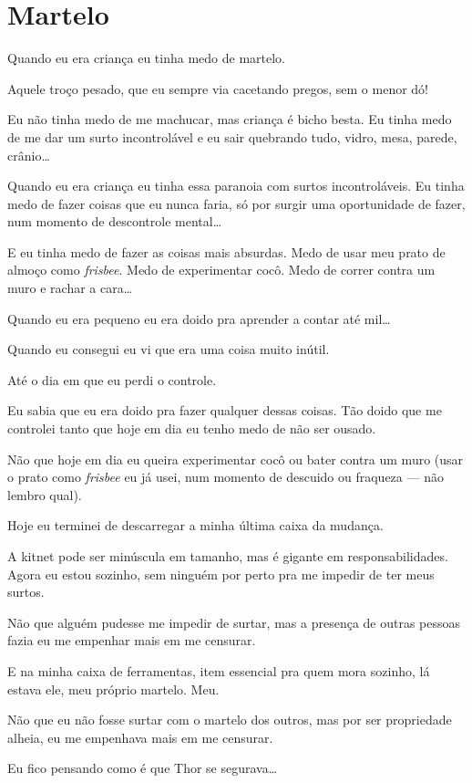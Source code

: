 \chapter{Martelo}

Quando eu era criança eu tinha medo de martelo.

Aquele troço pesado, que eu sempre via cacetando pregos, sem o menor dó!

Eu não tinha medo de me machucar, mas criança é bicho besta. Eu tinha medo de me dar um surto incontrolável e eu sair quebrando tudo, vidro, mesa, parede, crânio\ldots

Quando eu era criança eu tinha essa paranoia com surtos incontroláveis. Eu tinha medo de fazer coisas que eu nunca faria, só por surgir uma oportunidade de fazer, num momento de descontrole mental\ldots

E eu tinha medo de fazer as coisas mais absurdas. Medo de usar meu prato de almoço como \emph{frisbee}. Medo de experimentar cocô. Medo de correr contra um muro e rachar a cara\ldots

Quando eu era pequeno eu era doido pra aprender a contar até mil\ldots

Quando eu consegui eu vi que era uma coisa muito inútil.

Até o dia em que eu perdi o controle.

Eu sabia que eu era doido pra fazer qualquer dessas coisas. Tão doido que me controlei tanto que hoje em dia eu tenho medo de não ser ousado.

Não que hoje em dia eu queira experimentar cocô ou bater contra um muro (usar o prato como \emph{frisbee} eu já usei, num momento de descuido ou fraqueza --- não lembro qual).

Hoje eu terminei de descarregar a minha última caixa da mudança.

A kitnet pode ser minúscula em tamanho, mas é gigante em responsabilidades. Agora eu estou sozinho, sem ninguém por perto pra me impedir de ter meus surtos.

Não que alguém pudesse me impedir de surtar, mas a presença de outras pessoas fazia eu me empenhar mais em me censurar.

E na minha caixa de ferramentas, item essencial pra quem mora sozinho, lá estava ele, meu próprio martelo. Meu.

Não que eu não fosse surtar com o martelo dos outros, mas por ser propriedade alheia, eu me empenhava mais em me censurar.

Eu fico pensando como é que Thor se segurava\ldots

